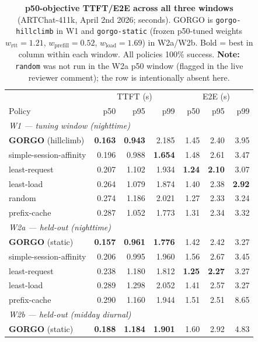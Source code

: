 \begin{table}[t]
\centering
\small
\caption{\textbf{p50-objective TTFT/E2E across all three windows} (ARTChat-411k,
  April 2nd 2026; seconds). GORGO is \texttt{gorgo-hillclimb} in W1 and
  \texttt{gorgo-static} (frozen p50-tuned weights $w_{\mathrm{rtt}}{=}1.21$,
  $w_{\mathrm{prefill}}{=}0.52$, $w_{\mathrm{load}}{=}1.69$) in W2a/W2b. Bold =
  best in column within each window. All policies 100\% success.
  \textbf{Note:} \texttt{random} was not run in the W2a p50 window (flagged in the
  live reviewer comment); the row is intentionally absent here.}
\label{tab:p50_all}
\begin{tabular}{lrrr|rrr}
\toprule
 & \multicolumn{3}{c|}{TTFT (s)} & \multicolumn{3}{c}{E2E (s)} \\
Policy & p50 & p95 & p99 & p50 & p95 & p99 \\
\midrule
\multicolumn{7}{l}{\textit{W1 --- tuning window (nighttime)}} \\
\textbf{GORGO} (hillclimb) & \textbf{0.163} & \textbf{0.943} & 2.185 & 1.45 & 2.40 & 3.95 \\
simple-session-affinity    & 0.196 & 0.988 & \textbf{1.654} & 1.48 & 2.61 & 3.47 \\
least-request              & 0.207 & 1.102 & 1.934 & \textbf{1.24} & \textbf{2.10} & 3.07 \\
least-load                 & 0.264 & 1.079 & 1.874 & 1.40 & 2.38 & \textbf{2.92} \\
random                     & 0.274 & 1.186 & 2.021 & 1.27 & 2.33 & 3.24 \\
prefix-cache               & 0.287 & 1.052 & 1.773 & 1.31 & 2.34 & 3.32 \\
\midrule
\multicolumn{7}{l}{\textit{W2a --- held-out (nighttime)}} \\
\textbf{GORGO} (static)    & \textbf{0.157} & \textbf{0.961} & \textbf{1.776} & 1.42 & 2.42 & 3.27 \\
simple-session-affinity    & 0.206 & 0.995 & 1.960 & 1.56 & 2.67 & 3.45 \\
least-request              & 0.238 & 1.180 & 1.812 & \textbf{1.25} & \textbf{2.27} & 3.27 \\
least-load                 & 0.289 & 1.298 & 2.052 & 1.41 & 2.57 & 3.27 \\
prefix-cache               & 0.290 & 1.160 & 1.944 & 1.51 & 2.51 & 8.65 \\
\midrule
\multicolumn{7}{l}{\textit{W2b --- held-out (midday diurnal)}} \\
\textbf{GORGO} (static)    & \textbf{0.188} & \textbf{1.184} & \textbf{1.901} & 1.60 & 2.92 & 4.83 \\

\end{tabular}
\end{table}
